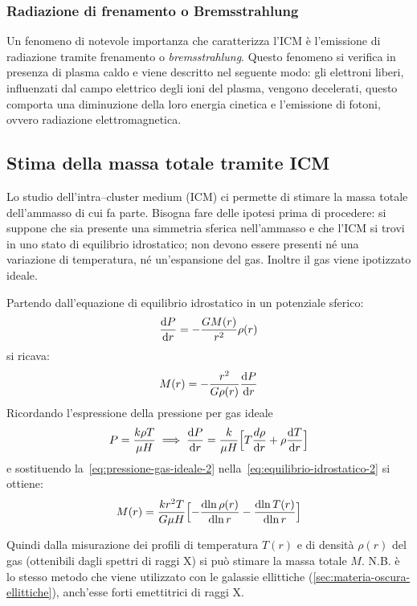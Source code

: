 \subsubsection{Radiazione di frenamento o Bremsstrahlung}\label{sec:bremsstrahlung}
Un fenomeno di notevole importanza che caratterizza l'ICM è l'emissione di radiazione tramite frenamento o \emph{bremsstrahlung}. 
Questo fenomeno si verifica in presenza di plasma caldo e viene descritto nel seguente modo: gli elettroni liberi, influenzati dal campo elettrico degli ioni del plasma, vengono decelerati, questo comporta una diminuzione della loro energia cinetica e l’emissione di fotoni, ovvero radiazione elettromagnetica.

\subsection{Stima della massa totale tramite ICM}
Lo studio dell’intra--cluster medium (ICM) ci permette di stimare la massa totale dell’ammasso di cui fa parte.
Bisogna fare delle ipotesi prima di procedere: 
si suppone che sia presente una simmetria sferica nell’ammasso e che l’ICM si trovi in uno stato di equilibrio idrostatico; non devono essere presenti né una variazione di temperatura, né un’espansione del gas.
Inoltre il gas viene ipotizzato ideale.

\noindent Partendo dall’equazione di equilibrio idrostatico in un potenziale sferico: 
\begin{equation} 
    \frac{\mathop{\mathrm{{}d}}\mathopen{} P}{\mathop{\mathrm{{}d}}\mathopen{} r} = - \frac{GM(r)}{r^2} \rho(r) 
\end{equation}
si ricava:
\begin{equation}\label{eq:equilibrio-idrostatico-2}
M(r) = - \frac{r^2}{G \rho(r)} \frac{\mathop{\mathrm{{}d}}\mathopen{} P}{\mathop{\mathrm{{}d}}\mathopen{} r}
\end{equation}
Ricordando l'espressione della pressione per gas ideale
\begin{equation} \label{eq:pressione-gas-ideale-2}
    P = \frac{k\rho T}{\mu H} \implies \frac{\mathop{\mathrm{{}d}}\mathopen{} P}{\mathop{\mathrm{{}d}}\mathopen{} r} = \frac{k}{\mu H}\Bigl[ T\frac{d\rho}{\mathop{\mathrm{{}d}}\mathopen{} r}+\rho \frac{\mathop{\mathrm{{}d}}\mathopen{} T}{\mathop{\mathrm{{}d}}\mathopen{} r}\Bigr]
\end{equation}
e sostituendo la~\ref{eq:pressione-gas-ideale-2} nella~\ref{eq:equilibrio-idrostatico-2} si ottiene:
\begin{equation}
    M(r) = \frac{k r^2 T}{G \mu H}\Bigl[-\frac{\mathop{\mathrm{{}d}}\mathopen{} \ln{\rho(r)}}{\mathop{\mathrm{{}d}}\mathopen{}\ln{r}} - \frac{\mathop{\mathrm{{}d}}\mathopen{} \ln{T(r)}}{\mathop{\mathrm{{}d}}\mathopen{} \ln{r}}\Bigr]
\end{equation}

Quindi dalla misurazione dei profili di temperatura $T(r)$ e di densità $\rho(r)$ del gas (ottenibili dagli spettri di raggi X) si può stimare la massa totale $M$. N.B. è lo stesso metodo che viene utilizzato con le galassie ellittiche (\ref{sec:materia-oscura-ellittiche}), anch’esse forti emettitrici di raggi X.

